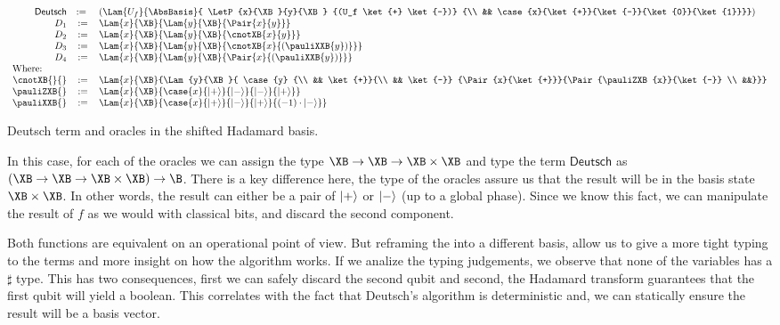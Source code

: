 \begin{table*}
    \footnotesize
    \[
    \begin{array}{r c l}
        \mathsf{Deutsch}&:=~&(\Lam{{U_f}}{\AbsBasis}{
                \LetP{x}{\XB}{y}{\XB}
                {(U_f \ket{+} \ket{-})}
                {\\ && \case{x}{\ket{+}}{\ket{-}}{\ket{0}}{\ket{1}}}})\\
        D_1 &:= &\Lam{x}{\XB}{\Lam{y}{\XB}{\Pair{x}{y}}}\\
        D_2 &:= &\Lam{x}{\XB}{\Lam{y}{\XB}{\cnotXB{x}{y}}}\\
        D_3 &:= &\Lam{x}{\XB}{\Lam{y}{\XB}{\cnotXB{x}{(\pauliXXB{y})}}}\\
        D_4 &:= &\Lam{x}{\XB}{\Lam{y}{\XB}{\Pair{x}{(\pauliXXB{y})}}}\\
        \multicolumn{3}{l}{\text{Where:}}\\
        \cnotXB{}{} &:=& \Lam{x}{\XB}{\Lam{y}{\XB}{
        \case{y}
        {\\ && \ket{+}}{\\ && \ket{-}}
        {\Pair{x}{\ket{+}}}{\Pair{\pauliZXB{x}}{\ket{-}} \\ &&}}}\\
        \pauliZXB{} &:=& \Lam{x}{\XB}{\case{x}{\ket{+}}{\ket{-}}{\ket{-}}{\ket{+}}}\\
        \pauliXXB{} &:=& \Lam{x}{\XB}{\case{x}{\ket{+}}{\ket{-}}{\ket{+}}{(-1)\cdot \ket{-}}}\\
    \end{array}
    \]
    \caption{Deutsch term and oracles in the shifted Hadamard basis.}
    \label{tab:DeutschShift}
\end{table*}

In this case, for each of the oracles we can assign the type $\XB\to\XB\to\XB\times\XB$ and type the term $\mathsf{Deutsch}$ as $(\XB\to\XB\to\XB\times\XB)\to\B$. There is a key difference here, the type of the oracles assure us that the result will be in the basis state $\XB\times\XB$. In other words, the result can either be a pair of $\left\vert{+}\right\rangle$ or $\left\vert{-}\right\rangle$ (up to a global phase). Since we know this fact, we can manipulate the result of $f$ as we would with classical bits, and discard the second component. 

Both functions are equivalent on an operational point of view. But reframing the into a different basis, allow us to give a more tight typing to the terms and more insight on how the algorithm works. If we analize the typing judgements, we observe that none of the variables has a $\sharp$ type. This has two consequences, first we can safely discard the second qubit and second, the Hadamard transform guarantees that the first qubit will yield a boolean. This correlates with the fact that Deutsch's algorithm is deterministic and, we can statically ensure the result will be a basis vector.

